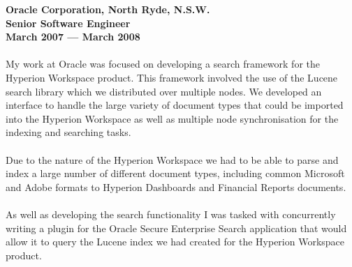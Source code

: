 \documentclass[a4paper]{article}
\begin{document}
\textbf{Oracle Corporation, North Ryde, N.S.W.\\Senior Software Engineer\\March 2007 --- March 2008}\\\\
My work at Oracle was focused on developing a search framework for the Hyperion Workspace product. This framework involved the use of the Lucene search library which we distributed over multiple nodes. We developed an interface to handle the large variety of document types that could be imported into the Hyperion Workspace as well as multiple node synchronisation for the indexing and searching tasks.\\\\
Due to the nature of the Hyperion Workspace we had to be able to parse and index a large number of different document types, including common Microsoft and Adobe formats to Hyperion Dashboards and Financial Reports documents.\\\\
As well as developing the search functionality I was tasked with concurrently writing a plugin for the Oracle Secure Enterprise Search application that would allow it to query the Lucene index we had created for the Hyperion Workspace product.\\\\

\newpage
\ryanHeader
\end{document}
